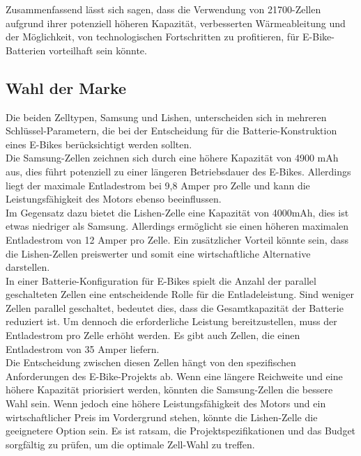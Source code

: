 Zusammenfassend lässt sich sagen, dass die Verwendung von 21700-Zellen aufgrund ihrer potenziell höheren Kapazität, verbesserten Wärmeableitung und der Möglichkeit, von technologischen Fortschritten zu profitieren, für E-Bike-Batterien vorteilhaft sein könnte.







\subsection{Wahl der Marke}
Die beiden Zelltypen, Samsung und Lishen, unterscheiden sich in mehreren Schlüssel-Parametern, die bei der Entscheidung für die Batterie-Konstruktion eines E-Bikes berücksichtigt werden sollten.\\
Die Samsung-Zellen zeichnen sich durch eine höhere Kapazität von 4900 mAh aus, dies führt potenziell zu einer längeren Betriebsdauer des E-Bikes.
Allerdings liegt der maximale Entladestrom bei 9,8 Amper pro Zelle und kann die Leistungsfähigkeit des Motors ebenso beeinflussen.\\

Im Gegensatz dazu bietet die Lishen-Zelle eine Kapazität von 4000mAh, dies ist etwas niedriger als Samsung.
Allerdings ermöglicht sie einen höheren maximalen Entladestrom von 12 Amper pro Zelle.
Ein zusätzlicher Vorteil könnte sein, dass die Lishen-Zellen preiswerter und somit eine wirtschaftliche Alternative darstellen.\\

In einer Batterie-Konfiguration für E-Bikes spielt die Anzahl der parallel geschalteten Zellen eine entscheidende Rolle für die Entladeleistung.
Sind weniger Zellen parallel geschaltet, bedeutet dies, dass die Gesamtkapazität der Batterie reduziert ist.
Um dennoch die erforderliche Leistung bereitzustellen, muss der Entladestrom pro Zelle erhöht werden.
Es gibt auch Zellen, die einen Entladestrom von 35 Amper liefern. \\

Die Entscheidung zwischen diesen Zellen hängt von den spezifischen Anforderungen des E-Bike-Projekts ab.
Wenn eine längere Reichweite und eine höhere Kapazität priorisiert werden, könnten die Samsung-Zellen die bessere Wahl sein.
Wenn jedoch eine höhere Leistungsfähigkeit des Motors und ein wirtschaftlicher Preis im Vordergrund stehen, könnte die Lishen-Zelle die geeignetere Option sein.
Es ist ratsam, die Projektspezifikationen und das Budget sorgfältig zu prüfen, um die optimale Zell-Wahl zu treffen.\\


